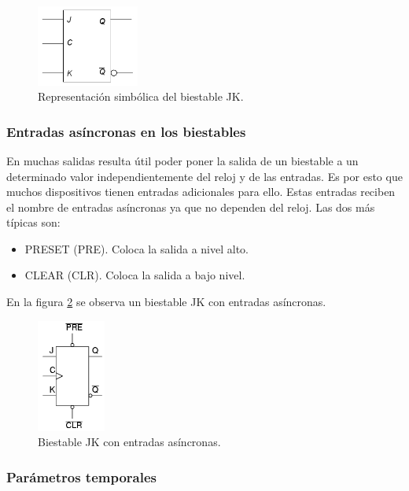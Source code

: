 \documentclass[a4paper, 11pt, titlepage]{article}
\begin{document}
			\begin{figure}[htp]
				\centering
				\includegraphics[width=0.3\textwidth]{resources/biestablejk.jpg}
				\caption{Representación simbólica del biestable JK.}
				\label{biestablejk}
			\end{figure}

		\subsubsection{Entradas asíncronas en los biestables}

			En muchas salidas resulta útil poder poner la salida de un biestable a un determinado 
			valor independientemente del reloj y de las entradas. Es por esto que muchos dispositivos 
			tienen entradas adicionales para ello. Estas entradas reciben el nombre de entradas 
			asíncronas ya que no dependen del reloj. Las dos más típicas son:

			\begin{itemize}
				\item PRESET (PRE). Coloca la salida a nivel alto.
				\item CLEAR (CLR). Coloca la salida a bajo nivel.
			\end{itemize}

			En la figura \ref{entradasasincronas} se observa un biestable JK con entradas asíncronas.

			\begin{figure}[htp]
				\centering
				\includegraphics[width=0.2\textwidth]{resources/entradasasincronas.png}
				\caption{Biestable JK con entradas asíncronas.}
				\label{entradasasincronas}
			\end{figure}

		\subsubsection{Parámetros temporales}
\end{document}
